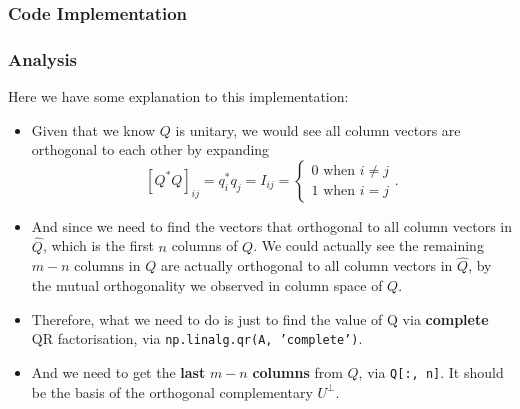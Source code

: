 \newpage
\subsubsection*{Code Implementation}%
\label{ssub:code_implementation}


\subsubsection*{Analysis}%
\label{ssub:analysis}
Here we have some explanation to this implementation:
\begin{itemize}
\item Given that we know $Q$ is unitary, we would see all column vectors are orthogonal to each other by expanding
  \[
    [Q^*Q]_{ij} = q_i^*q_j = I_{ij} = \left\{
      \begin{array}{l}
      0 \text{ when $i \neq j$} \\
      1 \text{ when $i = j$}
      \end{array}
    \right.
  .\] 
  \item And since we need to find the vectors that orthogonal to all column vectors in $\hat{Q}$, which is the first $n$ columns of $Q$. We could actually see the remaining $m - n$ columns in  $Q$ are actually orthogonal to all column vectors in $\hat{Q}$, by the mutual orthogonality we observed in column space of $Q$. 
  \item Therefore, what we need to do is just to find the value of Q via \textbf{complete} QR factorisation, via \texttt{np.linalg.qr(A, 'complete')}.
  \item And we need to get the \textbf{last} $m - n$ \textbf{columns} from $Q$, via \texttt{Q[:, n]}. It should be the basis of the orthogonal complementary $U^{\bot}$.
\end{itemize}


